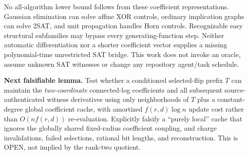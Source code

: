 \documentclass[11pt]{article}
\begin{document}
No all-algorithm lower bound follows from these coefficient representations. Gaussian elimination can solve affine XOR controls, ordinary implication graphs can solve 2SAT, and unit propagation handles Horn controls. Recognizable easy structural subfamilies may bypass every generating-function step. Neither automatic differentiation nor a shorter coefficient vector supplies a missing polynomial-time unrestricted SAT bridge. This work does not invoke an oracle, assume unknown SAT witnesses or change any repository agent/task schedule.

\noindent\textbf{Next falsifiable lemma.} Test whether a conditioned selected-flip prefix $T$ can maintain the \emph{two-coordinate} connected-log coefficients and all subsequent source-authenticated witness derivatives using only neighborhoods of $T$ plus a constant-degree global coefficient cache, with amortized $f(r,d)\log n$ update cost rather than $O(nf(r,d))$ re-evaluation. Explicitly falsify a ``purely local'' cache that ignores the globally shared fixed-radius coefficient coupling, and charge invalidations, failed selections, rational bit lengths, and reconstruction. This is OPEN, not implied by the rank-two quotient.


\end{document}
